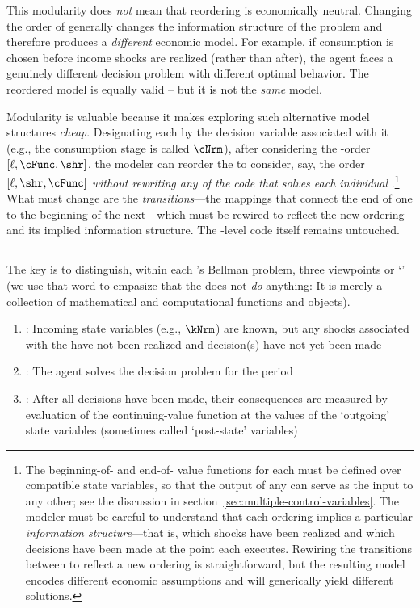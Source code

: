 This modularity does \textit{not} mean that reordering {\stgs} is economically neutral.  Changing the order of {\stgs} generally changes the information structure of the problem and therefore produces a \textit{different} economic model.  For example, if consumption is chosen before income shocks are realized (rather than after), the agent faces a genuinely different decision problem with different optimal behavior.  The reordered model is equally valid -- but it is not the \textit{same} model.

Modularity is valuable because it makes exploring such alternative model structures \textit{cheap}.  Designating each {\stg} by the decision variable associated with it (e.g., the consumption stage is called $\cNrm$), after considering the {\stg}-order $[\ell,\cFunc,\shr]$, the modeler can reorder the {\stgs} to consider, say, the order $[\ell,\shr,\cFunc]$ \textit{without rewriting any of the code that solves each individual {\stg}}.\footnote{The beginning-of-{\stg} and end-of-{\stg} value functions for each {\stg} must be defined over compatible state variables, so that the output of any {\stg} can serve as the input to any other; see the discussion in section~\ref{sec:multiple-control-variables}.  The modeler must be careful to understand that each ordering implies a particular \textit{information structure}---that is, which shocks have been realized and which decisions have been made at the point each {\stg} executes.  Rewiring the transitions between {\stgs} to reflect a new ordering is straightforward, but the resulting model encodes different economic assumptions and will generically yield different solutions.}  What must change are the \textit{transitions}---the mappings that connect the end of one {\stg} to the beginning of the next---which must be rewired to reflect the new ordering and its implied information structure.  The {\stg}-level code itself remains untouched.

\hypertarget{prchs}{}
\subsection{\Prchs}\label{subsec:prchs}

The key is to distinguish, within each {\stg}'s Bellman problem, three viewpoints or `{\prchs}' (we use that word to empasize that the {\prch} does not \textit{do} anything: It is merely a collection of mathematical and computational functions and objects).
\begin{enumerate}
\item \textbf{\Arrival}: Incoming state variables (e.g., $\kNrm$) are known, but any shocks associated with the {\stg} have not been realized and decision(s) have not yet been made
\item \textbf{\Decision}: The agent solves the decision problem for the period
\item \textbf{\Continuation}: After all decisions have been made, their consequences are measured by evaluation of the continuing-value function at the values of the `outgoing' state variables (sometimes called `post-state' variables)
\end{enumerate}

